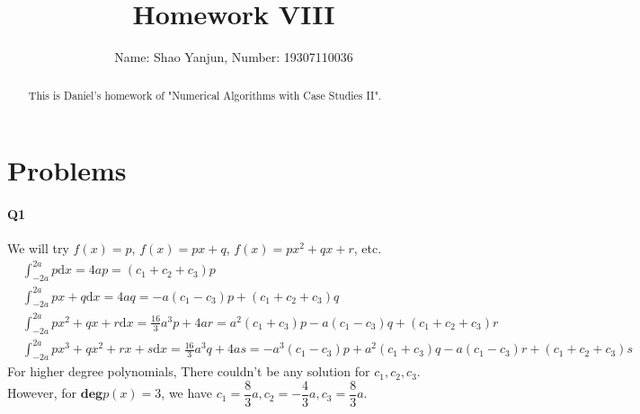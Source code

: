 \documentclass[11pt]{article}
\title{Homework VIII}
\author{Name: Shao Yanjun, Number: 19307110036}
\begin{document}
\maketitle

\begin{abstract}
This is Daniel's homework of  "Numerical Algorithms with Case Studies II".
\end{abstract}
\section{Problems}
\paragraph{Q1}
We will try $f(x)=p$, $f(x)=px+q$, $f(x)=px^2+qx+r$, etc.
\begin{align}
	&\int_{-2a}^{2a}p\mathrm{d}x=4ap=(c_1+c_2+c_3)p\\
	&\int_{-2a}^{2a}px+q\mathrm{d}x=4aq=-a(c_1-c_3)p+(c_1+c_2+c_3)q\\
	&\int_{-2a}^{2a}px^2+qx+r\mathrm{d}x=\frac{16}{3}a^3p+4ar=a^2(c_1+c_3)p-a(c_1-c_3)q+(c_1+c_2+c_3)r\\
	&\int_{-2a}^{2a}px^3+qx^2+rx+s\mathrm{d}x=\frac{16}{3}a^3q+4as=-a^3(c_1-c_3)p+a^2(c_1+c_3)q-a(c_1-c_3)r+(c_1+c_2+c_3)s
\end{align}
For higher degree polynomials, There couldn't be any solution for $c_1,c_2,c_3$. However, for $\mathbf{deg}p(x)=3$, we have $c_1=\dfrac{8}{3}a,c_2=-\dfrac{4}{3}a,c_3=\dfrac{8}{3}a$.
\end{document}
